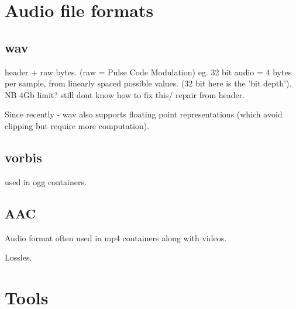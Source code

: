 \documentclass[oneside,english]{scrbook}
\begin{document}
\chapter{Audio file formats}

\section{wav}

header + raw bytes. (raw = Pulse Code Modulation) eg. 32 bit audio = 4 bytes per sample, from linearly spaced possible values. (32 bit here is the 'bit depth').
NB 4Gb limit? still dont know how to fix this/ repair from header.

Since recently - wav also supports floating point representations (which avoid clipping but require more computation).

\section{vorbis}
used in ogg containers.

\section{AAC}
Audio format often used in mp4 containers along with videos.

Lossles.

\chapter{Tools}
\end{document}
